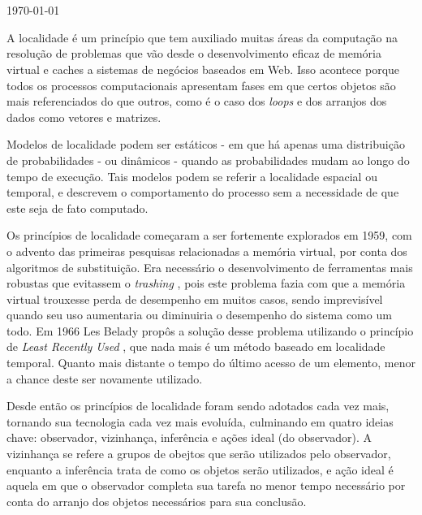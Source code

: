 \documentclass[11pt,a4paper]{article}
\newcommand{\titulo}[1]{\mbox{ Resumo 1 - Localidade }}
\newcommand{\autoria}[1]{\mbox{ Flaviene Scheidt de Cristo }}
\begin{document}
\begin{center}
\begin{Large}\textbf{\titulo}\end{Large}\\[1ex]
\begin{large}\textbf{\autoria}\end{large}\\[1ex]
\today
\end{center}


A localidade é um princípio que tem auxiliado muitas áreas da computação na resolução de problemas que vão desde o desenvolvimento eficaz de memória virtual e caches a sistemas de negócios baseados em Web. Isso acontece porque todos os processos computacionais apresentam fases em que certos objetos são mais referenciados do que outros, como é o caso dos \textit{ loops } e dos arranjos dos dados como vetores e matrizes.

Modelos de localidade podem ser estáticos - em que há apenas uma distribuição de probabilidades - ou dinâmicos - quando as probabilidades mudam ao longo do tempo de execução. Tais modelos podem se referir a localidade espacial ou temporal, e descrevem o comportamento do processo sem a necessidade de  que este seja de fato computado.

Os princípios de localidade começaram a ser fortemente explorados em 1959, com o advento das primeiras pesquisas relacionadas a memória virtual, por conta dos algoritmos de substituição. Era necessário o desenvolvimento de ferramentas mais robustas que evitassem o \textit{ trashing }, pois este problema fazia com que a memória virtual trouxesse perda de desempenho em muitos casos, sendo imprevisível quando seu uso aumentaria ou diminuiria o desempenho do sistema como um todo. Em 1966 Les Belady propôs a solução desse problema utilizando o princípio de \textit{ Least Recently Used }, que nada mais é um método baseado em localidade temporal. Quanto mais distante o tempo do último acesso de um elemento, menor a chance deste ser novamente utilizado.

Desde então os princípios de localidade foram sendo adotados cada vez mais, tornando sua tecnologia cada vez mais evoluída, culminando em quatro ideias chave: observador, vizinhança, inferência e ações ideal (do observador). A vizinhança se refere a grupos de obejtos que serão utilizados pelo observador, enquanto a inferência trata de como os objetos serão utilizados, e ação ideal é aquela em que o observador completa sua tarefa no menor tempo necessário por conta do arranjo dos objetos necessários para sua conclusão.
\end{document}
